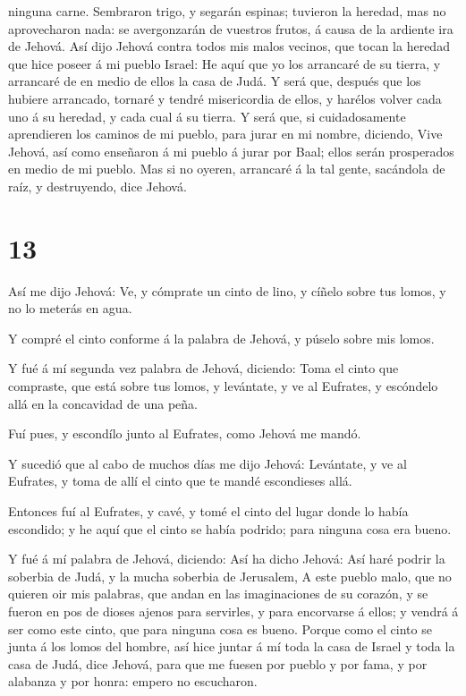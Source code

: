 ninguna carne.  Sembraron trigo, y segarán espinas;
tuvieron la heredad, mas no aprovecharon nada: se avergonzarán de
vuestros frutos, á causa de la ardiente ira de Jehová.  Así
dijo Jehová contra todos mis malos vecinos, que tocan la heredad que
hice poseer á mi pueblo Israel: He aquí que yo los arrancaré de su
tierra, y arrancaré de en medio de ellos la casa de Judá. 
Y será que, después que los hubiere arrancado, tornaré y tendré
misericordia de ellos, y harélos volver cada uno á su heredad, y cada
cual á su tierra.  Y será que, si cuidadosamente
aprendieren los caminos de mi pueblo, para jurar en mi nombre, diciendo,
Vive Jehová, así como enseñaron á mi pueblo á jurar por Baal; ellos
serán prosperados en medio de mi pueblo.  Mas si no oyeren,
arrancaré á la tal gente, sacándola de raíz, y destruyendo, dice Jehová.

\hypertarget{section-12}{%
\section{13}\label{section-12}}

 Así me dijo Jehová: Ve, y cómprate un cinto de lino, y
cíñelo sobre tus lomos, y no lo meterás en agua.

 Y compré el cinto conforme á la palabra de Jehová, y púselo
sobre mis lomos.

 Y fué á mí segunda vez palabra de Jehová, diciendo:
 Toma el cinto que compraste, que está sobre tus lomos, y
levántate, y ve al Eufrates, y escóndelo allá en la concavidad de una
peña.

 Fuí pues, y escondílo junto al Eufrates, como Jehová me
mandó.

 Y sucedió que al cabo de muchos días me dijo Jehová:
Levántate, y ve al Eufrates, y toma de allí el cinto que te mandé
escondieses allá.

 Entonces fuí al Eufrates, y cavé, y tomé el cinto del lugar
donde lo había escondido; y he aquí que el cinto se había podrido; para
ninguna cosa era bueno.

 Y fué á mí palabra de Jehová, diciendo:  Así ha
dicho Jehová: Así haré podrir la soberbia de Judá, y la mucha soberbia
de Jerusalem,  A este pueblo malo, que no quieren oir mis
palabras, que andan en las imaginaciones de su corazón, y se fueron en
pos de dioses ajenos para servirles, y para encorvarse á ellos; y vendrá
á ser como este cinto, que para ninguna cosa es bueno. 
Porque como el cinto se junta á los lomos del hombre, así hice juntar á
mí toda la casa de Israel y toda la casa de Judá, dice Jehová, para que
me fuesen por pueblo y por fama, y por alabanza y por honra: empero no
escucharon.

